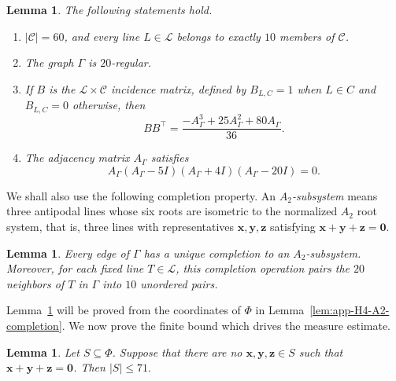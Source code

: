 \documentclass[11pt]{article}
\newtheorem{lemma}[theorem]{Lemma}
\theoremstyle{definition}
\begin{document}
\begin{lemma}
\label{lem:H4-line-incidence}
The following statements hold.
\begin{enumerate}
    \item[\textup{(i)}] \(|\mathcal C|=60\), and every line
    \(L\in\mathcal L\) belongs to exactly \(10\) members of \(\mathcal C\).
    \item[\textup{(ii)}] The graph \(\Gamma\) is \(20\)-regular.
    \item[\textup{(iii)}] If \(B\) is the \(\mathcal L\times\mathcal C\)
    incidence matrix, defined by \(B_{L,C}=1\) when \(L\in C\) and
    \(B_{L,C}=0\) otherwise, then
    \begin{equation}\label{eq:H4-BBT}
        BB^\top=\frac{-A_{\Gamma}^{3}+25A_{\Gamma}^{2}+80A_{\Gamma}}{36}.
    \end{equation}
    \item[\textup{(iv)}] The adjacency matrix \(A_{\Gamma}\) satisfies
    \begin{equation}\label{eq:H4-minpoly}
        A_{\Gamma}(A_{\Gamma}-5I)(A_{\Gamma}+4I)(A_{\Gamma}-20I)=0.
    \end{equation}
\end{enumerate}
\end{lemma}

We shall also use the following completion property.  An
\emph{\(A_{2}\)-subsystem} means three antipodal lines whose six roots are
isometric to the normalized \(A_{2}\) root system, that is, three lines
with representatives \(\boldsymbol{x},\boldsymbol{y},\boldsymbol{z}\)
satisfying \(\boldsymbol{x}+\boldsymbol{y}+\boldsymbol{z}=\boldsymbol{0}\).

\begin{lemma}\label{lem:H4-A2-completion}
Every edge of \(\Gamma\) has a unique completion to an \(A_{2}\)-subsystem.
Moreover, for each fixed line \(T\in\mathcal L\), this completion operation
pairs the \(20\) neighbors of \(T\) in \(\Gamma\) into \(10\) unordered
pairs.
\end{lemma}

Lemma~\ref{lem:H4-A2-completion} will be proved from the coordinates of \(\Phi\) in
Lemma~\ref{lem:app-H4-A2-completion}. We now prove the finite bound which drives the measure estimate.

\begin{lemma}\label{lem:H4-independent}
Let \(S\subseteq\Phi\).  Suppose that there are no
\(\boldsymbol{x},\boldsymbol{y},\boldsymbol{z}\in S\) such that
\(\boldsymbol{x}+\boldsymbol{y}+\boldsymbol{z}=\boldsymbol{0}\).  Then
\(
    |S|\le 71.
\)
\end{lemma}
\end{document}
